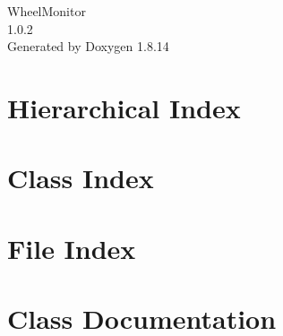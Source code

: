 \documentclass[twoside]{book}
\newcommand{\+}{\discretionary{\mbox{\scriptsize$\hookleftarrow$}}{}{}}
\newcommand{\clearemptydoublepage}{%
  \newpage{\pagestyle{empty}\cleardoublepage}%
}
\begin{document}
\hypersetup{pageanchor=false,
             bookmarksnumbered=true,
             pdfencoding=unicode
            }
\begin{titlepage}
\vspace*{7cm}
\begin{center}%
{\Large Wheel\+Monitor \\[1ex]\large 1.\+0.\+2 }\\
\vspace*{1cm}
{\large Generated by Doxygen 1.8.14}\\
\end{center}
\end{titlepage}
\clearemptydoublepage
{}
\tableofcontents
\clearemptydoublepage
{}
\hypersetup{pageanchor=true}

\chapter{Hierarchical Index}

\chapter{Class Index}

\chapter{File Index}

\chapter{Class Documentation}


































\end{document}
